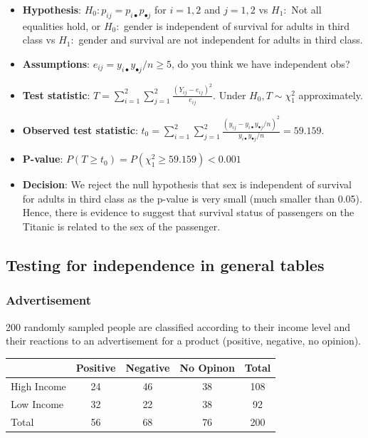 \documentclass[a4paper]{article}\usepackage[]{graphicx}\usepackage[]{xcolor}
\begin{document}
\begin{itemize}
	\item \textbf{Hypothesis}: \( H_0: p_{ij} = p_{i \bullet} p_{\bullet j} \) for \( i = 1,2 \) and \( j = 1,2 \) vs \( H_1: \) Not all equalities hold, or \( H_0: \) gender is independent of survival for adults in third class vs \( H_1: \)  gender and survival are not independent for adults in third class. 
	\item \textbf{Assumptions}: \( e_{ij} =y_{i \bullet} y_{\bullet j}/n \geq 5 \), do you think we have independent obs?
	\item \textbf{Test statistic}: \( T = \sum\limits_{i=1}^{2}\sum\limits_{j=1}^{2} \frac{(Y_{ij} - e_{ij})^2}{e_{ij}} \). Under \( H_0, T \sim \chi^2_1 \) approximately.
	\item \textbf{Observed test statistic}: \( t_0 = \sum\limits_{i=1}^{2} \sum\limits_{j=1}^{2} \frac{(y_{ij} - y_{i \bullet}y_{\bullet j}/n)^2}{y_{i \bullet}y_{\bullet j}/n} = 59.159 \).
	\item \textbf{P-value}: \( P(T\geq t_0) = P(\chi^2_1 \geq 59.159) < 0.001 \)
	\item \textbf{Decision}: We reject the null hypothesis that sex is independent of survival for adults in third class as the p-value is very small (much smaller than 0.05). Hence, there is evidence to suggest that survival status of passengers on the Titanic is related to the sex of the passenger.
\end{itemize}
\subsection{Testing for independence in general tables}
\subsubsection{Advertisement}
200 randomly sampled people are classified according to their income level and their reactions to an advertisement for a product (positive, negative, no opinion).
\begin{table}[H]
	\centering
	\begin{tabular}{@{}lccc|c@{}}
	\toprule
				& Positive & Negative & No Opinon & Total \\ \midrule
	High Income & 24       & 46       & 38        & 108   \\
	Low Income  & 32       & 22       & 38        & 92    \\ \midrule
	Total		& 56       & 68       & 76        & 200   \\ \bottomrule
	\end{tabular}
\end{table}
\end{document}
